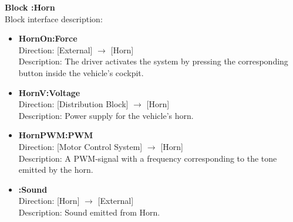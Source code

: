 \textbf{Block :Horn}\\
Block interface description:
\begin{itemize}
	\item \textbf{HornOn:Force}\\
	Direction: [External] $\rightarrow$ [Horn]\\
	Description: The driver activates the system by pressing the corresponding button inside the vehicle's cockpit.
	\item \textbf{HornV:Voltage}\\
	Direction: [Distribution Block] $\rightarrow$ [Horn]\\
	Description: Power supply for the vehicle's horn.
	\item \textbf{HornPWM:PWM}\\
	Direction: [Motor Control System] $\rightarrow$ [Horn]\\
	Description: A PWM-signal with a frequency corresponding to the tone emitted by the horn.
	\item \textbf{:Sound}\\
	Direction: [Horn] $\rightarrow$ [External]\\
	Description: Sound emitted from Horn.
\end{itemize}

